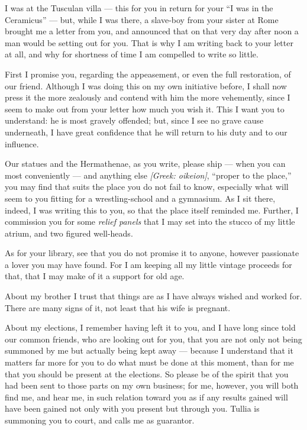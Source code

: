 

 I was at the Tusculan villa --- this for you in return for your ``I was in the Ceramicus'' --- but, while I was there, a slave-boy from your sister at Rome brought me a letter from you, and announced that on that very day after noon a man would be setting out for you. That is why I am writing back to your letter at all, and why for shortness of time I am compelled to write so little.

 First I promise you, regarding the appeasement, or even the full restoration, of our friend. Although I was doing this on my own initiative before, I shall now press it the more zealously and contend with him the more vehemently, since I seem to make out from your letter how much you wish it. This I want you to understand: he is most gravely offended; but, since I see no grave cause underneath, I have great confidence that he will return to his duty and to our influence.

 Our statues and the Hermathenae, as you write, please ship --- when you can most conveniently --- and anything else \textit{[Greek: oikeion]}, ``proper to the place,'' you may find that suits the place you do not fail to know, especially what will seem to you fitting for a wrestling-school and a gymnasium. As I sit there, indeed, I was writing this to you, so that the place itself reminded me. Further, I commission you for some \textit{relief panels} that I may set into the stucco of my little atrium, and two figured well-heads.

 As for your library, see that you do not promise it to anyone, however passionate a lover you may have found. For I am keeping all my little vintage proceeds for that, that I may make of it a support for old age.

 About my brother I trust that things are as I have always wished and worked for. There are many signs of it, not least that his wife is pregnant.

 About my elections, I remember having left it to you, and I have long since told our common friends, who are looking out for you, that you are not only not being summoned by me but actually being kept away --- because I understand that it matters far more for you to do what must be done at this moment, than for me that you should be present at the elections. So please be of the spirit that you had been sent to those parts on my own business; for me, however, you will both find me, and hear me, in such relation toward you as if any results gained will have been gained not only with you present but through you. Tullia is summoning you to court, and calls me as guarantor.
